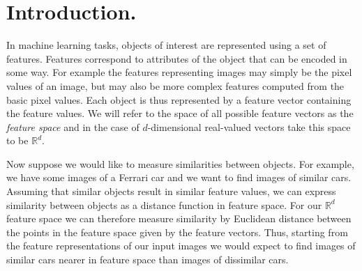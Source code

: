 









\section{Introduction.}

In machine learning tasks, objects of interest are represented using a set of features. Features correspond to attributes of the object that can be encoded in some way. For example the features representing images may simply be the pixel values of an image, but may also be more complex features computed from the basic pixel values. Each object is thus represented by a feature vector containing the feature values. We will refer to the space of all possible feature vectors as the \emph{feature space} and in the case of $d$-dimensional real-valued vectors take this space to be $\mathbb{R}^d$.

Now suppose we would like to measure similarities between objects. For example, we have some images of a Ferrari car and we want to find images of similar cars. Assuming that similar objects result in similar feature values, we can express similarity between objects as a distance function in feature space. For our $\mathbb{R}^d$ feature space we can therefore measure similarity by Euclidean distance between the points in the feature space given by the feature vectors. Thus, starting from the feature representations of our input images we would expect to find images of similar cars nearer in feature space than images of dissimilar cars.

